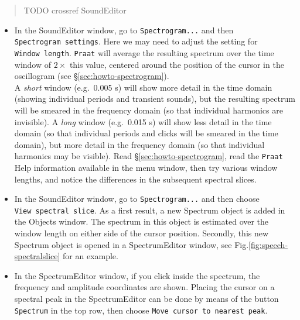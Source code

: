 \documentclass[
]{book}
\begin{document}
\begin{quote}
TODO crossref SoundEditor
\end{quote}

\begin{itemize}
\item
  In the SoundEditor window, go to \texttt{Spectrogram...} and then \texttt{Spectrogram\ settings}. Here we may need to adjust the setting for \texttt{Window\ length}. \texttt{Praat} will average the resulting spectrum over the time window of \(2\times\) this value, centered around the position of the cursor in the oscillogram (see §\ref{sec:howto-spectrogram}).\\
  A \emph{short} window (e.g.~0.005 s) will show more detail in the time domain (showing individual periods and transient sounds), but the resulting spectrum will be smeared in the frequency domain (so that individual harmonics are invisible). A \emph{long} window (e.g.~0.015 s) will show less detail in the time domain (so that individual periods and clicks will be smeared in the time domain), but more detail in the frequency domain (so that individual harmonics may be visible). Read §\ref{sec:howto-spectrogram}, read the \texttt{Praat} Help information available in the menu window, then try various window lengths, and notice the differences in the subsequent spectral slices.
\item
  In the SoundEditor window, go to \texttt{Spectrogram...} and then choose \texttt{View\ spectral\ slice}. As a first result, a new Spectrum object is added in the Objects window. The spectrum in this object is estimated over the window length on either side of the cursor position. Secondly, this new Spectrum object is opened in a SpectrumEditor window, see Fig.\ref{fig:speech-spectralslice} for an example.
\item
  In the SpectrumEditor window, if you click inside the spectrum, the frequency and amplitude coordinates are shown. Placing the cursor on a spectral peak in the SpectrumEditor can be done by means of the button \texttt{Spectrum} in the top row, then choose \texttt{Move\ cursor\ to\ nearest\ peak}.
\end{itemize}
\end{document}
